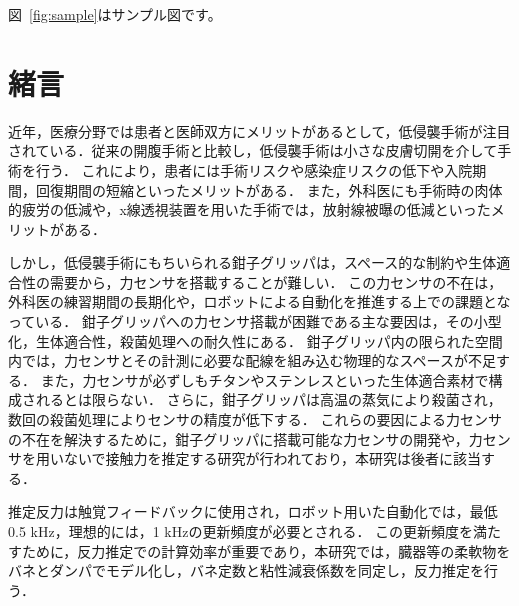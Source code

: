 \documentclass[a4paper]{jarticle}
\begin{document}
図~\ref{fig:sample}はサンプル図です。
\fi

\section{緒言}
近年，医療分野では患者と医師双方にメリットがあるとして，低侵襲手術が注目されている\cite{MIS_ref1}．従来の開腹手術と比較し，低侵襲手術は小さな皮膚切開を介して手術を行う．
これにより，患者には手術リスクや感染症リスクの低下\cite{MIS_ref2}や入院期間\cite{MIS_ref3}，回復期間の短縮\cite{MIS_ref4}といったメリットがある．
また，外科医にも手術時の肉体的疲労の低減や，x線透視装置を用いた手術では，放射線被曝の低減といったメリットがある\cite{MIS_ref5}．

しかし，低侵襲手術にもちいられる鉗子グリッパは，スペース的な制約\cite{MIS_ref1}や生体適合性の需要\cite{MIS_ref6}から，力センサを搭載することが難しい．
この力センサの不在は，外科医の練習期間の長期化\cite{?}や，ロボットによる自動化を推進する上での課題となっている\cite{?}．
鉗子グリッパへの力センサ搭載が困難である主な要因は，その小型化，生体適合性，殺菌処理への耐久性にある\cite{?}．
鉗子グリッパ内の限られた空間内では，力センサとその計測に必要な配線を組み込む物理的なスペースが不足する\cite{?}．
また，力センサが必ずしもチタンやステンレスといった生体適合素材で構成されるとは限らない\cite{MIS_ref6}．
さらに，鉗子グリッパは高温の蒸気により殺菌され，数回の殺菌処理によりセンサの精度が低下する\cite{?}．
これらの要因による力センサの不在を解決するために，鉗子グリッパに搭載可能な力センサの開発\cite{?}や，力センサを用いないで接触力を推定する研究\cite{?}が行われており，本研究は後者に該当する．

 推定反力は触覚フィードバックに使用され，ロボット用いた自動化では，最低0.5 kHz\cite{fps_ref1}，理想的には，1 kHzの更新頻度が必要とされる\cite{fps_ref2}．
この更新頻度を満たすために，反力推定での計算効率が重要であり，本研究では，臓器等の柔軟物をバネとダンパでモデル化し，バネ定数と粘性減衰係数を同定し，反力推定を行う．
\end{document}
